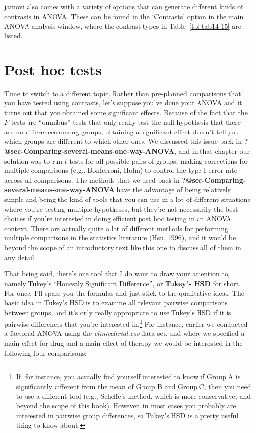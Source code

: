 \documentclass[
  a4paper,
]{book}
\begin{document}
jamovi also comes with a variety of options that can generate different
kinds of contrasts in ANOVA. These can be found in the `Contrasts'
option in the main ANOVA analysis window, where the contrast types in
Table~\ref{tbl-tab14-15} are listed.

\hypertarget{sec-Post-hoc-tests}{%
\section{Post hoc tests}\label{sec-Post-hoc-tests}}

Time to switch to a different topic. Rather than pre-planned comparisons
that you have tested using contrasts, let's suppose you've done your
ANOVA and it turns out that you obtained some significant effects.
Because of the fact that the \(F\)-tests are ``omnibus'' tests that only
really test the null hypothesis that there are no differences among
groups, obtaining a significant effect doesn't tell you which groups are
different to which other ones. We discussed this issue back in
\textbf{?@sec-Comparing-several-means-one-way-ANOVA}, and in that
chapter our solution was to run \(t\)-tests for all possible pairs of
groups, making corrections for multiple comparisons (e.g., Bonferroni,
Holm) to control the type I error rate across all comparisons. The
methods that we used back in
\textbf{?@sec-Comparing-several-means-one-way-ANOVA} have the advantage
of being relatively simple and being the kind of tools that you can use
in a lot of different situations where you're testing multiple
hypotheses, but they're not necessarily the best choices if you're
interested in doing efficient post hoc testing in an ANOVA context.
There are actually quite a lot of different methods for performing
multiple comparisons in the statistics literature (Hsu, 1996), and it
would be beyond the scope of an introductory text like this one to
discuss all of them in any detail.

That being said, there's one tool that I do want to draw your attention
to, namely Tukey's ``Honestly Significant Difference'', or
\textbf{Tukey's HSD} for short. For once, I'll spare you the formulas
and just stick to the qualitative ideas. The basic idea in Tukey's HSD
is to examine all relevant pairwise comparisons between groups, and it's
only really appropriate to use Tukey's HSD if it is pairwise differences
that you're interested in.\footnote{If, for instance, you actually find
  yourself interested to know if Group A is significantly different from
  the mean of Group B and Group C, then you need to use a different tool
  (e.g., Scheffe's method, which is more conservative, and beyond the
  scope of this book). However, in most cases you probably are
  interested in pairwise group differences, so Tukey's HSD is a pretty
  useful thing to know about.} For instance, earlier we conducted a
factorial ANOVA using the \emph{clinicaltrial.csv} data set, and where
we specified a main effect for drug and a main effect of therapy we
would be interested in the following four comparisons:
\end{document}
